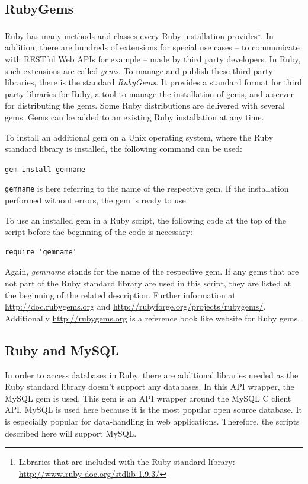 \subsection{RubyGems}
Ruby has many methods and classes every Ruby installation provides\footnote{Libraries that are included with the Ruby standard library: \url{http://www.ruby-doc.org/stdlib-1.9.3/}}. In addition, there are hundreds of extensions for special use cases – to communicate with RESTful Web APIs for example – made by third party developers. In Ruby, such extensions are called \emph{gems}. To manage and publish these third party libraries, there is the standard \emph{RubyGems}. It provides a standard format for third party libraries for Ruby, a tool to manage the installation of gems, and a server for distributing the gems. \cite{ruby:gemdev} Some Ruby distributions are delivered with several gems. Gems can be added to an existing Ruby installation at any time.

To install an additional gem on a Unix operating system, where the Ruby standard library is installed, the following command can be used:  
\begin{center}
\texttt{gem install gemname}
\end{center}
\texttt{gemname} is here referring to the name of the respective gem. If the installation performed without errors, the gem is ready to use. \cite{ruby:gemdoc}

To use an installed gem in a Ruby script, the following code at the top of the script before the beginning of the code is necessary:

\begin{lstlisting}[aboveskip=1\baselineskip, caption=Using the gem \emph{gemname}, label=listing001]
require 'gemname'
\end{lstlisting}
Again, \emph{gemname} stands for the name of the respective gem. If any gems that are not part of the Ruby standard library are used in this script, they are listed at the beginning of the related description. Further information at \url{http://doc.rubygems.org} and \url{http://rubyforge.org/projects/rubygems/}. Additionally\alena{,} \url{http://rubygems.org} is a reference book like website for Ruby gems.

\subsection{Ruby and MySQL}\label{rubymysql}
In order to access databases in Ruby, there are additional libraries needed as the Ruby standard library doesn't support any databases. In this API wrapper, the MySQL gem is used. This gem is an API wrapper around the MySQL C client API. MySQL is used here because it is the most popular open source database. \cite{mysql:popularity} It is especially popular for data-handling in web applications. Therefore, the scripts described here will support MySQL.

